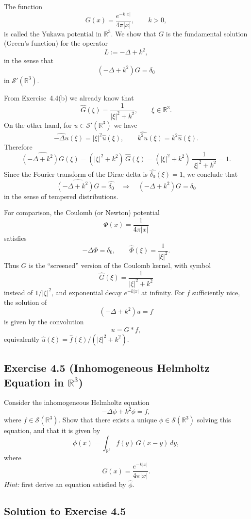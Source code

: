\documentclass[12pt,a4paper]{article}
\theoremstyle{plain}
\theoremstyle{definition}
\theoremstyle{remark}
\theoremstyle{remark}
\begin{document}
The function
\[
G(x) = \frac{e^{-k|x|}}{4\pi |x|}, \qquad k>0,
\]
is called the Yukawa potential in $\mathbb{R}^3$.  We show that $G$ is the
fundamental solution (Green's function) for the operator
\[
L := -\Delta + k^2,
\]
in the sense that
\[
(-\Delta + k^2)G = \delta_0
\]
in $\mathcal{S}'(\mathbb{R}^3)$.

From Exercise~4.4(b) we already know that
\[
\widehat{G}(\xi) = \frac{1}{|\xi|^2 + k^2}, \qquad \xi\in\mathbb{R}^3.
\]
On the other hand, for $u\in\mathcal{S}'(\mathbb{R}^3)$ we have
\[
\widehat{-\Delta u}(\xi) = |\xi|^2 \widehat{u}(\xi),
\qquad
\widehat{k^2 u}(\xi) = k^2 \widehat{u}(\xi).
\]
Therefore
\[
\widehat{(-\Delta + k^2)G}(\xi)
= (|\xi|^2 + k^2)\,\widehat{G}(\xi)
= (|\xi|^2 + k^2)\,\frac{1}{|\xi|^2 + k^2}
= 1.
\]
Since the Fourier transform of the Dirac delta is $\widehat{\delta_0}(\xi)=1$,
we conclude that
\[
\widehat{(-\Delta + k^2)G}
= \widehat{\delta_0}
\quad\Longrightarrow\quad
(-\Delta + k^2)G = \delta_0
\]
in the sense of tempered distributions.

For comparison, the Coulomb (or Newton) potential
\[
\Phi(x) = \frac{1}{4\pi |x|}
\]
satisfies
\[
-\Delta \Phi = \delta_0,
\qquad
\widehat{\Phi}(\xi) = \frac{1}{|\xi|^2}.
\]
Thus $G$ is the ``screened'' version of the Coulomb kernel, with symbol
\[
\widehat{G}(\xi) = \frac{1}{|\xi|^2 + k^2}
\]
instead of $1/|\xi|^2$, and exponential decay $e^{-k|x|}$ at infinity.  For
$f$ sufficiently nice, the solution of
\[
(-\Delta + k^2)u = f
\]
is given by the convolution
\[
u = G * f,
\]
equivalently $\widehat{u}(\xi) = \widehat{f}(\xi) / (|\xi|^2 + k^2)$.

\subsection*{Exercise 4.5 (Inhomogeneous Helmholtz Equation in $\mathbb{R}^3$)}

Consider the inhomogeneous Helmholtz equation
\[
-\Delta \phi + k^{2}\phi = f,
\]
where $f\in\mathcal{S}(\mathbb{R}^3)$.
Show that there exists a unique $\phi\in\mathcal{S}(\mathbb{R}^3)$ solving this
equation, and that it is given by
\[
\phi(x) = \int_{\mathbb{R}^3} f(y)\,G(x-y)\,dy,
\]
where
\[
G(x) = \frac{e^{-k|x|}}{4\pi |x|}.
\]
\emph{Hint:} first derive an equation satisfied by $\widehat{\phi}$.

\subsection*{Solution to Exercise 4.5}
\end{document}
